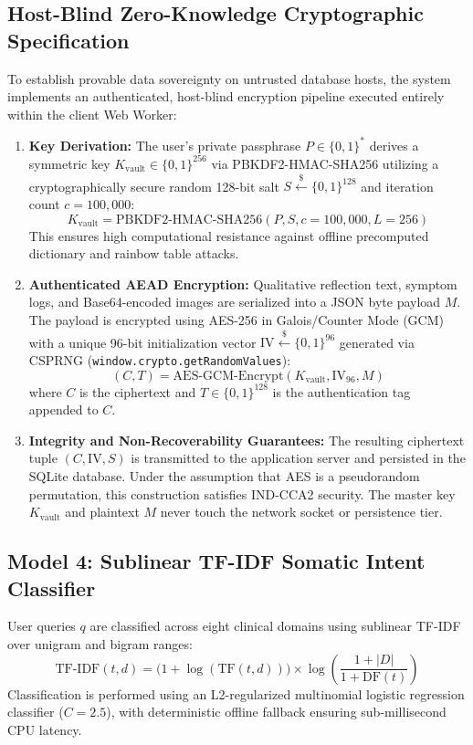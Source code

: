 \documentclass[conference]{IEEEtran}
\begin{document}
\subsection{Host-Blind Zero-Knowledge Cryptographic Specification}
To establish provable data sovereignty on untrusted database hosts, the system implements an authenticated, host-blind encryption pipeline executed entirely within the client Web Worker:
\begin{enumerate}
    \item \textbf{Key Derivation:} The user's private passphrase $P \in \{0,1\}^*$ derives a symmetric key $K_{\text{vault}} \in \{0,1\}^{256}$ via PBKDF2-HMAC-SHA256 utilizing a cryptographically secure random 128-bit salt $S \stackrel{\$}{\leftarrow} \{0,1\}^{128}$ and iteration count $c = 100{,}000$:
    \begin{equation}
    K_{\text{vault}} = \text{PBKDF2-HMAC-SHA256}(P, S, c = 100{,}000, L = 256)
    \end{equation}
    This ensures high computational resistance against offline precomputed dictionary and rainbow table attacks.
    \item \textbf{Authenticated AEAD Encryption:} Qualitative reflection text, symptom logs, and Base64-encoded images are serialized into a JSON byte payload $M$. The payload is encrypted using AES-256 in Galois/Counter Mode (GCM) with a unique 96-bit initialization vector $\text{IV} \stackrel{\$}{\leftarrow} \{0,1\}^{96}$ generated via CSPRNG (\texttt{window.crypto.getRandomValues}):
    \begin{equation}
    (C, T) = \text{AES-GCM-Encrypt}(K_{\text{vault}}, \text{IV}_{96}, M)
    \end{equation}
    where $C$ is the ciphertext and $T \in \{0,1\}^{128}$ is the authentication tag appended to $C$.
    \item \textbf{Integrity and Non-Recoverability Guarantees:} The resulting ciphertext tuple $(C, \text{IV}, S)$ is transmitted to the application server and persisted in the SQLite database. Under the assumption that AES is a pseudorandom permutation, this construction satisfies IND-CCA2 security. The master key $K_{\text{vault}}$ and plaintext $M$ never touch the network socket or persistence tier.
\end{enumerate}

\subsection{Model 4: Sublinear TF-IDF Somatic Intent Classifier}
User queries $q$ are classified across eight clinical domains using sublinear TF-IDF over unigram and bigram ranges:
\begin{equation}
\text{TF-IDF}(t, d) = \big(1 + \log(\text{TF}(t, d))\big) \times \log\left(\frac{1 + |D|}{1 + \text{DF}(t)}\right)
\end{equation}
Classification is performed using an L2-regularized multinomial logistic regression classifier ($C = 2.5$), with deterministic offline fallback ensuring sub-millisecond CPU latency.
\end{document}
